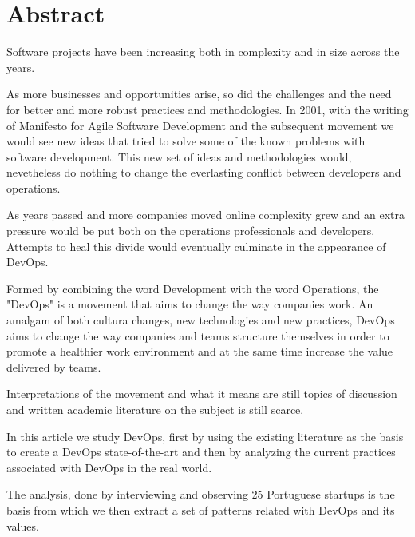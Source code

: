 \chapter*{Abstract}

Software projects have been increasing both in complexity and in size across the years.

As more businesses and opportunities arise, so did the challenges and the need for better and more robust practices and methodologies.
In 2001, with the writing of Manifesto for Agile Software Development and the subsequent movement we would see new ideas that tried to solve some of the known problems with software development. This new set of ideas and methodologies would, nevetheless do nothing to change the everlasting conflict between developers and operations.

As years passed and more companies moved online complexity grew and an extra pressure would be put both on the operations professionals and developers.
Attempts to heal this divide would eventually culminate in the appearance of DevOps.

Formed by combining the word Development with the word Operations, the "DevOps" is a movement that aims to change the way companies work. An amalgam of both cultura changes, new technologies and new practices, DevOps aims to change the way companies and teams structure themselves in order to promote a healthier work environment and at the same time increase the value delivered by teams.

Interpretations of the movement and what it means are still topics of discussion and written academic literature on the subject is still scarce.

In this article we study DevOps, first by using the existing literature as the basis to create a DevOps state-of-the-art and then by analyzing the current practices associated with DevOps in the real world.

The analysis, done by interviewing and observing 25 Portuguese startups is the basis from which we then extract a set of patterns related with DevOps and its values.
